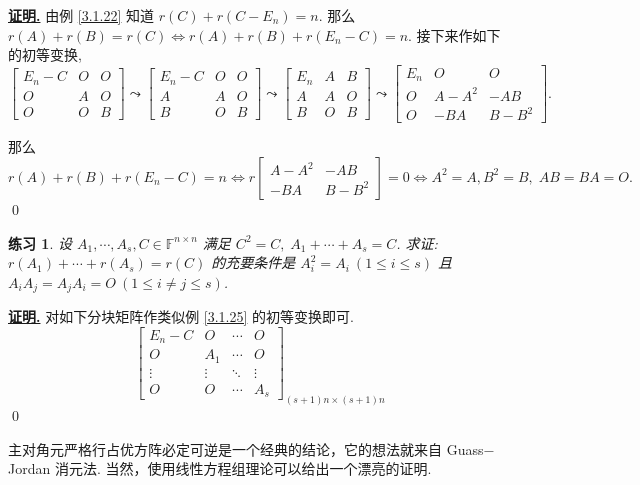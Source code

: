 \documentclass[10pt,openany]{article}
\theoremstyle{thmstyle} %
\newtheorem{practice}{练习}[section]
\theoremstyle{defstyle} %
\theoremstyle{prostyle} %
\theoremstyle{exastyle}
\theoremstyle{remstyle}
\renewenvironment{proof}[1][证明]{\par\underline{\textbf{#1.}} \;\fangsong}{\qed\par}
\newcommand{\F}{\mathbb{F}}
\newcommand{\n}{^{n \times n}}
\begin{document}
\begin{proof}
	由例 \ref{3.1.22} 知道 \( r(C)+r(C-E_n)=n \). 那么 \( r(A) + r(B) = r(C) \Leftrightarrow r(A)+r(B)+r(E_n-C)=n \). 接下来作如下的初等变换,
	\[ \begin{bmatrix}
		E_n-C & O & O \\
		O & A & O \\
		O & O & B
	\end{bmatrix} \leadsto  \begin{bmatrix}
		E_n-C & O & O \\
		A & A & O \\
		B & O & B
	\end{bmatrix} \leadsto  \begin{bmatrix}
		E_n & A & B \\
		A & A & O \\
		B & O & B
	\end{bmatrix} \leadsto \begin{bmatrix}
		E_n & O & O \\
		O & A-A^2 & -AB \\
		O & -BA & B-B^2
	\end{bmatrix}. \]
	
	那么
	\[  r(A)+r(B)+r(E_n-C)=n \Leftrightarrow r\begin{bmatrix}
		A-A^2 & -AB \\
		-BA & B-B^2
	\end{bmatrix}=0 \Leftrightarrow A^2 = A, B^2 = B, \; AB = BA = O. \]
\end{proof}


\begin{practice}
	设 \(  A_1,\cdots,A_s, C \in \F\n \) 满足 \( C^2=C, \; A_1+\cdots+A_s= C \). 求证: \( r(A_1) + \cdots+ r(A_s) = r(C) \) 的充要条件是  
	\( A_i^2=A_i \ (1 \leq i \leq s) \) 且 \( A_iA_j = A_jA_i = O \ (1 \leq i \neq j \leq s)\).
\end{practice}

\begin{proof}
	对如下分块矩阵作类似例 \ref{3.1.25} 的初等变换即可.
	\[ \begin{bmatrix}
		E_n-C & O & \cdots & O \\
		O & A_1 & \cdots & O \\
		\vdots & \vdots & \ddots & \vdots \\
		O & O & \cdots & A_s
	\end{bmatrix}_{(s+1)n \times (s+1)n} \]
\end{proof}

主对角元严格行占优方阵必定可逆是一个经典的结论，它的想法就来自 Guass\(-\)Jordan 消元法. 当然，使用线性方程组理论可以给出一个漂亮的证明.
\end{document}

